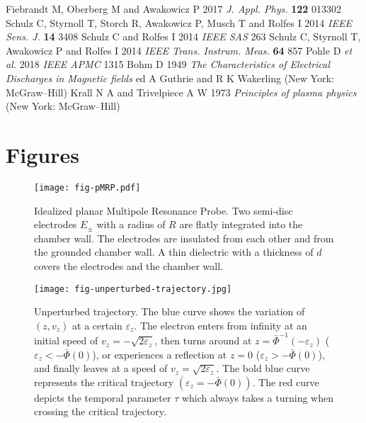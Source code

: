 \documentclass[superscriptaddress,preprint]{revtex4}  %
\newif\iffigures
\begin{document}
\begin{spacing}{1}
\begin{thebibliography}{30}
	Fiebrandt M, Oberberg M and Awakowicz P 2017 \textit{J. Appl. Phys.} \textbf{122} 013302 	
	Schulz C, Styrnoll T, Storch R, Awakowicz P, Musch T and Rolfes I 2014 \textit{IEEE Sens. J.} \textbf{14} 3408		
	Schulz C and Rolfes I 2014 \textit{IEEE SAS} 263
	Schulz C, Styrnoll T, Awakowicz P and Rolfes I 2014 \textit{IEEE Trans. Instrum. Meas.} \textbf{64} 857
	Pohle D \textit{et al.} 2018 \textit{IEEE APMC} 1315		
	Bohm D 1949 \textit{The Characteristics of Electrical Discharges in Magnetic fields} ed A Guthrie and R K Wakerling (New York: McGraw–Hill)
	Krall N A and Trivelpiece A W 1973 \textit{Principles of plasma physics} (New York: McGraw–Hill)
\end{thebibliography}
\end{spacing}


\pagebreak



\section*{Figures}
\iffigures
\begin{figure}[h!]
	\centering
	\texttt{[image: fig-pMRP.pdf]} \\
	\caption{Idealized planar Multipole Resonance Probe. Two semi-disc electrodes $E_\pm$ with a radius of $R$ are flatly integrated into the chamber wall. The electrodes are insulated from each other and from the grounded chamber wall. A thin dielectric with a thickness of $d$ covers the electrodes and the chamber wall.}
	\label{Ideal pMRP}
\end{figure}


\begin{figure}[h!]
	\centering
	\texttt{[image: fig-unperturbed-trajectory.jpg]} \\
	\caption{Unperturbed trajectory. The blue curve shows the variation of $(z,v_z)$ at a certain $\varepsilon_z$. The electron enters from infinity at an initial speed of $v_z=-\sqrt{2\varepsilon_z}$, then turns around at $z={\bar\Phi}^{-1}\left(-\varepsilon_z\right)$ ($\varepsilon_z<-\bar\Phi(0)$), or experiences a reflection at $z=0$ ($\varepsilon_z>-\bar\Phi(0)$), and finally leaves at a speed of $v_z=\sqrt{2\varepsilon_z}$. The bold blue curve represents the critical trajectory $(\varepsilon_z=-\bar\Phi(0))$. The red curve depicts the temporal parameter $\tau$ which always takes a turning when crossing the critical trajectory.}
	\label{Unperturbed trajectory}
\end{figure}
\pagebreak
\end{document}
